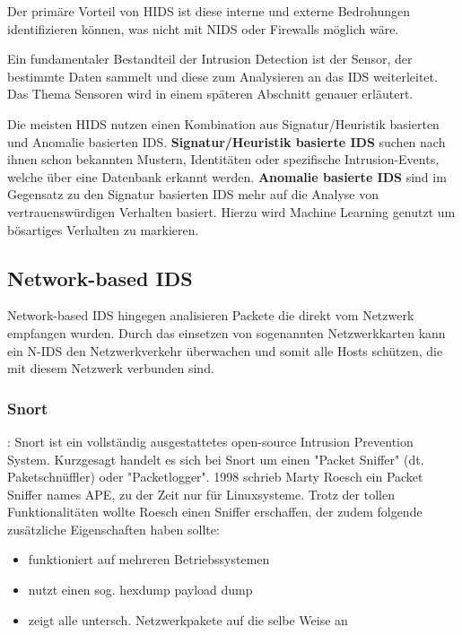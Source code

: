 Der primäre Vorteil von HIDS ist diese interne und externe Bedrohungen identifizieren können, was nicht mit NIDS oder Firewalls möglich wäre.

Ein fundamentaler Bestandteil der Intrusion Detection ist der Sensor, der bestimmte Daten sammelt und diese zum Analysieren an das IDS weiterleitet. Das Thema Sensoren wird in einem späteren Abschnitt genauer erläutert.

Die meisten HIDS nutzen einen Kombination aus Signatur/Heuristik basierten und Anomalie basierten IDS.\cite{hids_url_1}
\textbf{Signatur/Heuristik basierte IDS} suchen nach ihnen schon bekannten Mustern, Identitäten oder spezifische Intrusion-Events, welche über eine Datenbank erkannt werden.\cite{hids_url_1}
\textbf{Anomalie basierte IDS} sind im Gegensatz zu den Signatur basierten IDS mehr auf die Analyse von vertrauenswürdigen Verhalten basiert. Hierzu wird Machine Learning genutzt um bösartiges Verhalten zu markieren.\cite{hids_url_1}

\subsection{Network-based IDS}
Network-based IDS hingegen analisieren Packete die direkt vom Netzwerk empfangen wurden. Durch das einsetzen von sogenannten Netzwerkkarten kann ein N-IDS den Netzwerkverkehr überwachen und somit alle Hosts schützen, die mit diesem Netzwerk verbunden sind.\cite{IDS_1}

\subsubsection{Snort}:
Snort ist ein vollständig ausgestattetes open-source Intrusion Prevention System\cite{snort_url}. Kurzgesagt handelt es sich bei Snort um einen "Packet Sniffer" (dt. Paketschnüffler) oder "Packetlogger". 
1998 schrieb Marty Roesch ein Packet Sniffer names APE, zu der Zeit nur für Linuxsysteme. Trotz der tollen Funktionalitäten wollte Roesch einen Sniffer erschaffen, der zudem folgende zusätzliche Eigenschaften haben sollte:\cite{snort_book_1}

\begin{itemize}
  \item funktioniert auf mehreren Betriebssystemen
  \item nutzt einen sog. hexdump payload dump
  \item zeigt alle untersch. Netzwerkpakete auf die selbe Weise an
\end{itemize}

